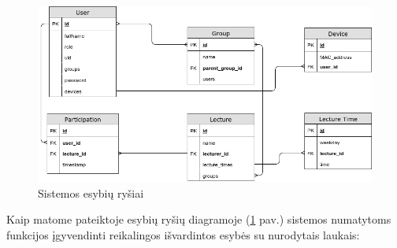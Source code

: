 \documentclass{VUMIFPSkursinis}
\begin{document}
\begin{figure}[H]
	\centering
	\includegraphics[scale=0.5]{img/Bakalauro-ER.png}
	\caption{Sistemos esybių ryšiai}
	\label{img:er-diagram}
\end{figure}

Kaip matome pateiktoje esybių ryšių diagramoje (\ref{img:er-diagram} pav.) sistemos numatytoms funkcijos įgyvendinti reikalingos išvardintos esybės su nurodytais laukais:
\end{document}
